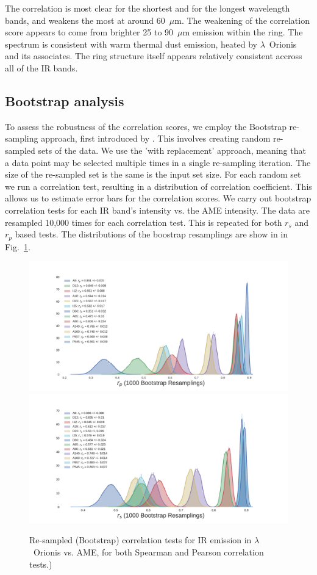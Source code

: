     The correlation is most clear for the shortest and for the longest wavelength bands, and weakens the most at around 60~$\mu$m. The weakening of the correlation score appears to come from brighter 25 to 90~$\mu$m emission within the ring. The spectrum is consistent with warm thermal dust emission, heated by $\lambda$~Orionis and its associates. The ring structure itself appears relatively consistent accross all of the IR bands.
    \subsection{Bootstrap analysis}
        To assess the robustness of the correlation scores, we employ the Bootstrap re-sampling approach, first introduced by \cite{efron79}. This involves creating random re-sampled sets of the data. We use the 'with replacement' approach, meaning that a data point may be selected multiple times in a single re-sampling iteration. The size of the re-sampled set is the same is the input set size. For each random set we run a correlation test, resulting in a distribution of correlation coefficient. This allows us to estimate error bars for the correlation scores.
        We carry out bootstrap correlation tests for each IR band's intensity vs. the AME intensity. The data are resampled 10,000 times for each correlation test. This is repeated for both $r_{s}$ and $r_{p}$ based tests. The distributions of the boostrap resamplings are show in in Fig.~\ref{fig:bootstrap_vs_AME}.
            \begin{figure}
              \includegraphics[width=\textwidth]{../Plots/ch_lori/bootstrap_vs_AME_pearson_i1000.pdf}
              \includegraphics[width=\textwidth]{../Plots/ch_lori/bootstrap_vs_AME_spearman_i1000.pdf}
              \centering
              \caption{Re-sampled (Bootstrap) correlation tests for IR emission in $\lambda$~Orionis vs. AME, for both Spearman and Pearson correlation tests.) }
              \label{fig:bootstrap_vs_AME}
            \end{figure}
